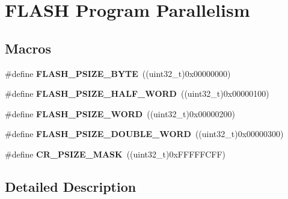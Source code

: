 \hypertarget{group___f_l_a_s_h___program___parallelism}{}\section{F\+L\+A\+SH Program Parallelism}
\label{group___f_l_a_s_h___program___parallelism}
\subsection*{Macros}
\begin{DoxyCompactItemize}
\item 
\#define {\bfseries F\+L\+A\+S\+H\+\_\+\+P\+S\+I\+Z\+E\+\_\+\+B\+Y\+TE}~((uint32\+\_\+t)0x00000000)\hypertarget{group___f_l_a_s_h___program___parallelism_ga83c67710aa697216193654e1e90cc953}{}\label{group___f_l_a_s_h___program___parallelism_ga83c67710aa697216193654e1e90cc953}

\item 
\#define {\bfseries F\+L\+A\+S\+H\+\_\+\+P\+S\+I\+Z\+E\+\_\+\+H\+A\+L\+F\+\_\+\+W\+O\+RD}~((uint32\+\_\+t)0x00000100)\hypertarget{group___f_l_a_s_h___program___parallelism_gad3210ba7423b45cb3063f4294cdeab16}{}\label{group___f_l_a_s_h___program___parallelism_gad3210ba7423b45cb3063f4294cdeab16}

\item 
\#define {\bfseries F\+L\+A\+S\+H\+\_\+\+P\+S\+I\+Z\+E\+\_\+\+W\+O\+RD}~((uint32\+\_\+t)0x00000200)\hypertarget{group___f_l_a_s_h___program___parallelism_gac3ac337ed43efc869a9f734527e44673}{}\label{group___f_l_a_s_h___program___parallelism_gac3ac337ed43efc869a9f734527e44673}

\item 
\#define {\bfseries F\+L\+A\+S\+H\+\_\+\+P\+S\+I\+Z\+E\+\_\+\+D\+O\+U\+B\+L\+E\+\_\+\+W\+O\+RD}~((uint32\+\_\+t)0x00000300)\hypertarget{group___f_l_a_s_h___program___parallelism_ga0fd17c4e281f199f09a6a6365e9243ee}{}\label{group___f_l_a_s_h___program___parallelism_ga0fd17c4e281f199f09a6a6365e9243ee}

\item 
\#define {\bfseries C\+R\+\_\+\+P\+S\+I\+Z\+E\+\_\+\+M\+A\+SK}~((uint32\+\_\+t)0x\+F\+F\+F\+F\+F\+C\+F\+F)\hypertarget{group___f_l_a_s_h___program___parallelism_ga7c755f15e36221021a1438857e40365c}{}\label{group___f_l_a_s_h___program___parallelism_ga7c755f15e36221021a1438857e40365c}

\end{DoxyCompactItemize}


\subsection{Detailed Description}
